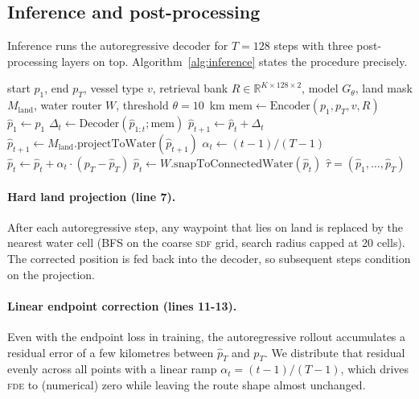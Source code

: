 \documentclass[11pt,a4paper]{article}
\newcommand{\fde}{\textsc{fde}}
\newcommand{\sdf}{\textsc{sdf}}
\begin{document}
\subsection{Inference and post-processing}\label{sec:inference}

Inference runs the autoregressive decoder for $T = 128$ steps with three
post-processing layers on top.  Algorithm~\ref{alg:inference} states the
procedure precisely.

\begin{algorithm}[t]
\caption{Inference: v10 + WaterRouter snap-only.}
\label{alg:inference}
\begin{algorithmic}[1]
\REQUIRE start $p_1$, end $p_T$, vessel type $v$,
         retrieval bank $R \in \mathbb{R}^{K \times 128 \times 2}$,
         model $G_\theta$, land mask $M_{\mathrm{land}}$,
         water router $W$, threshold $\theta = 10$~km
\STATE $\mathrm{mem} \leftarrow \mathrm{Encoder}(p_1, p_T, v, R)$
\STATE $\hat p_1 \leftarrow p_1$
  \STATE $\Delta_t \leftarrow
          \mathrm{Decoder}(\hat p_{1:t}; \mathrm{mem})$
  \STATE $\hat p_{t+1} \leftarrow \hat p_t + \Delta_t$
    \STATE $\hat p_{t+1} \leftarrow
            M_{\mathrm{land}}.\mathrm{projectToWater}(\hat p_{t+1})$
  \ENDIF
\ENDFOR
\STATE {}
  \STATE $\alpha_t \leftarrow (t - 1) / (T - 1)$
  \STATE $\hat p_t \leftarrow \hat p_t + \alpha_t \cdot
                              (p_T - \hat p_T)$
\ENDFOR
\STATE {}
    \STATE $\hat p_t \leftarrow W.\mathrm{snapToConnectedWater}(\hat p_t)$
  \ENDIF
\ENDFOR
\RETURN $\hat \tau = (\hat p_1, \ldots, \hat p_T)$
\end{algorithmic}
\end{algorithm}

\paragraph{Hard land projection (line 7).}
After each autoregressive step, any waypoint that lies on land is
replaced by the nearest water cell (BFS on the coarse \sdf{} grid,
search radius capped at 20 cells).  The corrected position is fed back
into the decoder, so subsequent steps condition on the projection.

\paragraph{Linear endpoint correction (lines 11-13).}
Even with the endpoint loss in training, the autoregressive rollout
accumulates a residual error of a few kilometres between
$\hat p_T$ and $p_T$.  We distribute that residual evenly across all
points with a linear ramp $\alpha_t = (t-1) / (T-1)$, which drives \fde{}
to (numerical) zero while leaving the route shape almost unchanged.
\end{document}
